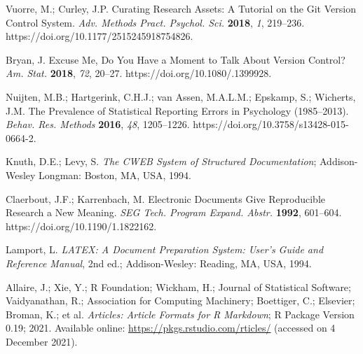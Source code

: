 \documentclass[psych,tutorial,accept,moreauthors,pdftex]{Definitions/mdpi}
\begin{document}
\begin{thebibliography}{999}
Vuorre, M.; Curley, J.P. Curating Research Assets: A Tutorial on the Git Version Control System. \emph{Adv. Methods Pract. Psychol. Sci.} \textbf{2018}, \emph{1}, 219--236. https://doi.org/10.1177/2515245918754826.

Bryan, J. Excuse Me, Do You Have a Moment to Talk About Version Control? \emph{Am. Stat.} \textbf{2018}, \emph{72}, 20--27. https://doi.org/10.1080/.1399928.

Nuijten, M.B.; Hartgerink, C.H.J.; van Assen, M.A.L.M.; Epskamp, S.; Wicherts, J.M. The Prevalence of Statistical Reporting Errors in Psychology (1985--2013). \emph{Behav. Res. Methods} \textbf{2016}, \emph{48}, 1205--1226. https://doi.org/10.3758/s13428-015-0664-2.

Knuth, D.E.; Levy, S. \emph{The CWEB System of Structured Documentation}; Addison-Wesley Longman: {Boston, MA, USA, 1994.}


Claerbout, J.F.; Karrenbach, M. Electronic Documents Give Reproducible Research a New Meaning. \emph{SEG Tech. Program Expand. Abstr.} \textbf{1992}, 601--604. https://doi.org/10.1190/1.1822162.


Lamport, L. \emph{LATEX: A Document Preparation System: User’s Guide and Reference Manual}, 2nd ed.; Addison-Wesley: Reading, MA, USA, 1994.


Allaire, J.; Xie, Y.; R Foundation; Wickham, H.; Journal of Statistical Software; Vaidyanathan, R.; Association for Computing Machinery; Boettiger, C.; Elsevier; Broman, K.; et al. \emph{Articles: Article Formats for R Markdown}; R Package Version 0.19; {2021.}  Available online: \url{https://pkgs.rstudio.com/rticles/} (accessed on 4 December 2021).



\end{thebibliography}
\end{document}
